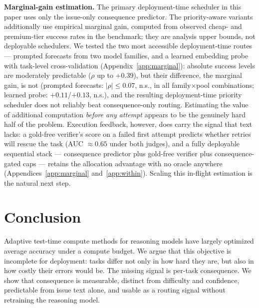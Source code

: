 \documentclass{article}
\begin{document}
\textbf{Marginal-gain estimation.} The primary deployment-time
scheduler in this paper uses only the issue-only consequence predictor.
The priority-aware variants additionally use empirical marginal gain,
computed from observed cheap- and premium-tier success rates in the
benchmark; they are analysis upper bounds, not deployable schedulers.
We tested the two most accessible deployment-time routes --- prompted
forecasts from two model families, and a learned embedding probe with
task-level cross-validation (Appendix~\ref{app:marginal}): absolute success levels
are moderately predictable ($\rho$ up to $+0.39$), but their
difference, the marginal gain, is not (prompted forecasts:
$|\rho| \le 0.07$, n.s., in all family$\times$pool combinations;
learned probe: $+0.11$/$+0.13$, n.s.), and the resulting
deployment-time priority scheduler does not reliably beat
consequence-only routing. Estimating the value of additional
computation \emph{before any attempt} appears to be the genuinely
hard half of the problem. Execution feedback, however, does carry the
signal that text lacks: a gold-free verifier's score on a failed
first attempt predicts whether retries will rescue the task
(AUC $\approx 0.65$ under both judges), and a fully deployable
sequential stack --- consequence predictor plus gold-free verifier
plus consequence-gated caps --- retains the allocation advantage with
no oracle anywhere (Appendices~\ref{app:marginal}
and~\ref{app:within}). Scaling this in-flight estimation is the
natural next step.

\section{Conclusion}

Adaptive test-time compute methods for reasoning models have largely
optimized average accuracy under a compute budget. We argue that this
objective is incomplete for deployment: tasks differ not only in how
hard they are, but also in how costly their errors would be. The
missing signal is per-task consequence. We show that consequence is
measurable, distinct from difficulty and confidence, predictable from
issue text alone, and usable as a routing signal without retraining the
reasoning model.
\end{document}
